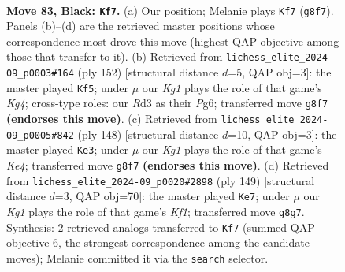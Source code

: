 \documentclass[11pt]{article}
\begin{document}
\begin{figure}[p]\centering
\begin{subfigure}{0.46\textwidth}\centering
\resizebox{\linewidth}{!}{%
\newchessgame
\chessboard[
  setfen={1R4k1/8/8/6K1/r6P/3r4/8/8 b - - 8 83},
  showmover=false,
  pgfstyle=straightmove, color=movearrow, markmove={g8-f7}
]}
\caption{}
\end{subfigure}\hfill
\begin{subfigure}{0.46\textwidth}\centering
\resizebox{\linewidth}{!}{%
\newchessgame
\chessboard[
  setfen={8/8/1r4P1/4R3/6K1/8/4p3/5k2 w - - 1 77},
  showmover=false,
  pgfstyle=straightmove, color=movearrow, markmove={g4-f5}
]}
\caption{}
\end{subfigure}
\\[4pt]
\begin{subfigure}{0.46\textwidth}\centering
\resizebox{\linewidth}{!}{%
\newchessgame
\chessboard[
  setfen={8/8/8/8/4K3/8/1R3p2/4k3 w - - 2 75},
  showmover=false,
  pgfstyle=straightmove, color=movearrow, markmove={e4-e3}
]}
\caption{}
\end{subfigure}\hfill
\begin{subfigure}{0.46\textwidth}\centering
\resizebox{\linewidth}{!}{%
\newchessgame
\chessboard[
  setfen={R4k2/8/6K1/5P2/8/8/8/5r2 b - - 2 75},
  showmover=false,
  pgfstyle=straightmove, color=movearrow, markmove={f8-e7}
]}
\caption{}
\end{subfigure}
\caption{\textbf{Move 83, Black: \texttt{Kf7}.} (a) Our position; Melanie plays \texttt{Kf7} (\texttt{g8f7}). Panels (b)--(d) are the retrieved master positions whose correspondence most drove this move (highest QAP objective among those that transfer to it). (b) Retrieved from \texttt{lichess\_elite\_2024-09\_p0003\#164} (ply 152) [structural distance $d$=5, QAP obj=3]: the master played \texttt{Kf5}; under $\mu$ our \emph{Kg1} plays the role of that game's \emph{Kg4}; cross-type roles: our \emph{R}d3 as their \emph{P}g6; transferred move \texttt{g8f7} \textbf{(endorses this move)}. (c) Retrieved from \texttt{lichess\_elite\_2024-09\_p0005\#842} (ply 148) [structural distance $d$=10, QAP obj=3]: the master played \texttt{Ke3}; under $\mu$ our \emph{Kg1} plays the role of that game's \emph{Ke4}; transferred move \texttt{g8f7} \textbf{(endorses this move)}. (d) Retrieved from \texttt{lichess\_elite\_2024-09\_p0020\#2898} (ply 149) [structural distance $d$=3, QAP obj=70]: the master played \texttt{Ke7}; under $\mu$ our \emph{Kg1} plays the role of that game's \emph{Kf1}; transferred move \texttt{g8g7}. Synthesis: 2 retrieved analogs transferred to \texttt{Kf7} (summed QAP objective 6, the strongest correspondence among the candidate moves); Melanie committed it via the \texttt{search} selector.}
\label{fig:thought-m165}
\end{figure}
\end{document}
